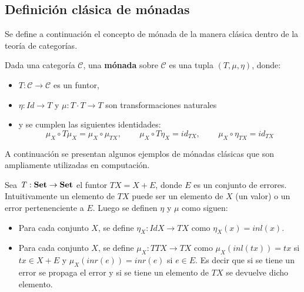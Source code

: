 \subsection{Definición clásica de mónadas}\label{monadas:usual}
Se define a continuación el concepto de mónada de la manera clásica dentro de la teoría de categorías.

\begin{definition}[Mónada]
Dada una categoría $\mathscr{C}$, una \textbf{mónada} sobre $\mathscr{C}$ es una tupla $(\mathit{T},\mu,\eta)$, donde:
\begin{itemize}[noitemsep,label=$\blacktriangleright$]
	\item $\mathit{T} : \mathscr{C} \rightarrow \mathscr{C}$ es un funtor,
	\item $\eta : \mathit{Id} \rightarrow \mathit{T}$ y $\mu : \mathit{T} \cdot \mathit{T} \rightarrow \mathit{T}$ son transformaciones naturales
	\item y se cumplen las siguientes identidades:
	\begin{equation*}
		\mu_X \circ \mathit{T}\mu_X = \mu_X \circ \mu_{\mathit{T}X} \text{, } \qquad \mu_X \circ \mathit{T}\eta_X = id_{\mathit{T}X} \text{, } \qquad 
		\mu_X \circ \eta_{\mathit{T}X} = id_{\mathit{T}X} 
	\end{equation*}
\end{itemize}
\end{definition}

A continuación se presentan algunos ejemplos de mónadas clásicas que son ampliamente utilizadas en computación.

\begin{ejemplo}
Sea $\mathit{T} : \text{\bf Set} \rightarrow \text{\bf Set}$ el funtor $\mathit{T} X = X + E$, donde $E$ es un conjunto de errores. Intuitivamente un elemento de $\mathit{T} X$ puede ser un elemento de $X$ (un valor) o un error pertenenciente a $E$. Luego se definen $\eta$ y $\mu$ como siguen:
\begin{itemize}[noitemsep, label=$\blacktriangleright$]
	\item Para cada conjunto $X$, se define $\eta_X : \mathit{Id} X \rightarrow \mathit{T} X$ como $\eta_X (x) = inl(x)$.
	\item Para cada conjunto $X$, se define $\mu_X : \mathit{T T} X \rightarrow \mathit{T} X$ como $\mu_X (inl(tx)) = tx$ si $tx \in X + E$ y $\mu_X (inr(e)) = inr(e)$ si $e \in E$. Es decir que si se tiene un error se propaga el error y si se tiene un elemento de $\mathit{T} X$ se devuelve dicho elemento. 
\end{itemize}
\end{ejemplo}

